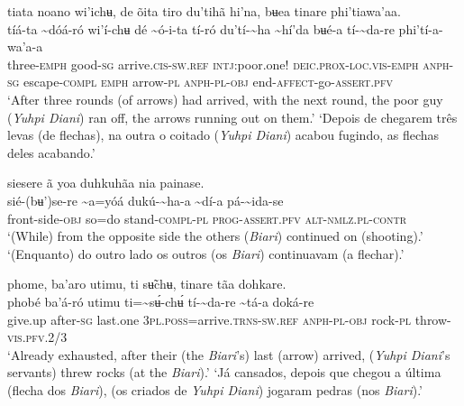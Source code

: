 \documentclass[output=paper,
modfonts,nonflat
]{langsci/langscibook}
\begin{document}
\largerpage 
\ea tiata noano wi'ichʉ, de õita tiro du'tihã hi'na, bʉea tinare phi'tiawa'aa. \\[.3em]
\gll tíá-ta	{\textasciitilde}dóá-ró	wi'í-chʉ	dé	{\textasciitilde}ó-i-ta	tí-ró du'tí-{\textasciitilde}ha	{\textasciitilde}hí'da	bʉé-a	tí-{\textasciitilde}da-re{\footnotemark}	phi'tí-a-wa'a-a\\
     three-\textsc{emph}	good\textsc{-sg}	arrive\textsc{.cis-sw.ref}	\textsc{intj:}poor.one!	\textsc{deic.prox-loc.vis-emph}	\textsc{anph-sg} escape-\textsc{compl}	\textsc{emph}	arrow\textsc{-pl}	\textsc{anph-pl-obj}	end-\textsc{affect}-go-\textsc{assert.pfv}\\
\glt ‘After three rounds (of arrows) had arrived, with the next round, the poor guy (\textit{Yuhpi Diani}) ran off, the arrows running out on them.’
\newpage 
\glt ‘Depois de chegarem três levas (de flechas), na outra o coitado (\textit{Yuhpi Diani}) acabou fugindo, as flechas deles acabando.’
\z

  
\ea siesere ã yoa duhkuhãa nia painase. \\[.3em]
\gll sié-(bʉ')se-re	{\textasciitilde}a=yóá	dukú-{\textasciitilde}ha-a	{\textasciitilde}dí-a	pá-{\textasciitilde}ida-se \\
     front-side\textsc{-obj}	so=do	stand-\textsc{compl-pl}	\textsc{prog-assert.pfv}	\textsc{alt-nmlz.pl-contr}\\
\glt ‘(While) from the opposite side the others (\textit{Biari}) continued on (shooting).’
\glt ‘(Enquanto) do outro lado os outros (os \textit{Biari}) continuavam (a flechar).’
\z 

 
\ea phome, ba'aro utimu, ti sʉ̃chʉ, tinare tãa dohkare. \\[.3em]
\gll {\textasciitilde}phobé	ba'á-ró	utimu	ti={\textasciitilde}sʉ́-chʉ́	tí-{\textasciitilde}da-re	{\textasciitilde}tá-a	doká-re \\
     give.up	after\textsc{-sg}	last.one	3\textsc{pl.poss}=arrive.\textsc{trns-sw.ref}	\textsc{anph-pl-obj}	rock\textsc{-pl}	throw-\textsc{vis.pfv.}2/3\\
\glt ‘Already exhausted, after their (the \textit{Biari}’s) last (arrow) arrived, (\textit{Yuhpi Diani}'s servants) threw rocks (at the \textit{Biari}).’
\glt ‘Já cansados, depois que chegou a última (flecha dos \textit{Biari}), (os criados de \textit{Yuhpi Diani}) jogaram pedras (nos \textit{Biari}).’
\z 
\end{document}
